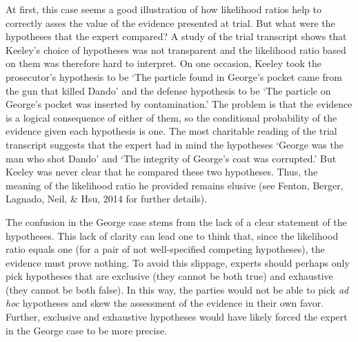 \documentclass[
  letterpaper,
  DIV=11,
  numbers=noendperiod]{scrartcl}
\begin{document}
At first, this case seems a good illustration of how likelihood ratios
help to correctly asses the value of the evidence presented at trial.
But what were the hypotheses that the expert compared? A study of the
trial transcript shows that Keeley's choice of hypotheses was not
transparent and the likelihood ratio based on them was therefore hard to
interpret. On one occasion, Keeley took the prosecutor's hypothesis to
be `The particle found in George's pocket came from the gun that killed
Dando' and the defense hypothesis to be `The particle on George's pocket
was inserted by contamination.' The problem is that the evidence is a
logical consequence of either of them, so the conditional probability of
the evidence given each hypothesis is one. The most charitable reading
of the trial transcript suggests that the expert had in mind the
hypotheses `George was the man who shot Dando' and `The integrity of
George's coat was corrupted.' But Keeley was never clear that he
compared these two hypotheses. Thus, the meaning of the likelihood ratio
he provided remains elusive (see Fenton, Berger, Lagnado, Neil, \& Hsu,
2014 for further details).

The confusion in the George case stems from the lack of a clear
statement of the hypotheses. This lack of clarity can lead one to think
that, since the likelihood ratio equals one (for a pair of not
well-specified competing hypotheses), the evidence must prove nothing.
To avoid this slippage, experts should perhaps only pick hypotheses that
are exclusive (they cannot be both true) and exhaustive (they cannot be
both false). In this way, the parties would not be able to pick
\textit{ad hoc} hypotheses and skew the assessment of the evidence in
their own favor. Further, exclusive and exhaustive hypotheses would have
likely forced the expert in the George case to be more precise.
\end{document}
